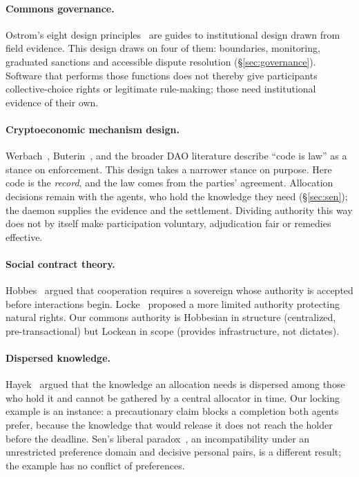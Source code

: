 \documentclass[11pt,a4paper]{article}
\theoremstyle{definition}
\theoremstyle{remark}
\begin{document}
\paragraph{Commons governance.}  Ostrom's eight design principles~ are guides to institutional design drawn from field evidence. This design draws on four of them: boundaries, monitoring, graduated sanctions and accessible dispute resolution (\S\ref{sec:governance}). Software that performs those functions does not thereby give participants collective-choice rights or legitimate rule-making; those need institutional evidence of their own.
\paragraph{Cryptoeconomic mechanism design.} Werbach~, Buterin~, and the broader DAO literature describe ``code is law'' as a stance on enforcement. This design takes a narrower stance on purpose. Here code is the \emph{record}, and the law comes from the parties' agreement. Allocation decisions remain with the agents, who hold the knowledge they need (\S\ref{sec:sen}); the daemon supplies the evidence and the settlement. Dividing authority this way does not by itself make participation voluntary, adjudication fair or remedies effective.

\paragraph{Social contract theory.} Hobbes~ argued that cooperation requires a sovereign whose authority is accepted before interactions begin. Locke~ proposed a more limited authority protecting natural rights. Our commons authority is Hobbesian in structure (centralized, pre-transactional) but Lockean in scope (provides infrastructure, not dictates).

\paragraph{Dispersed knowledge.} Hayek~ argued that the
knowledge an allocation needs is dispersed among those who hold it and cannot
be gathered by a central allocator in time. Our locking example is an
instance: a precautionary claim blocks a completion both agents prefer,
because the knowledge that would release it does not reach the holder before
the deadline. Sen's liberal paradox~, an
incompatibility under an unrestricted preference domain and decisive personal
pairs, is a different result; the example has no conflict of preferences.
\end{document}

